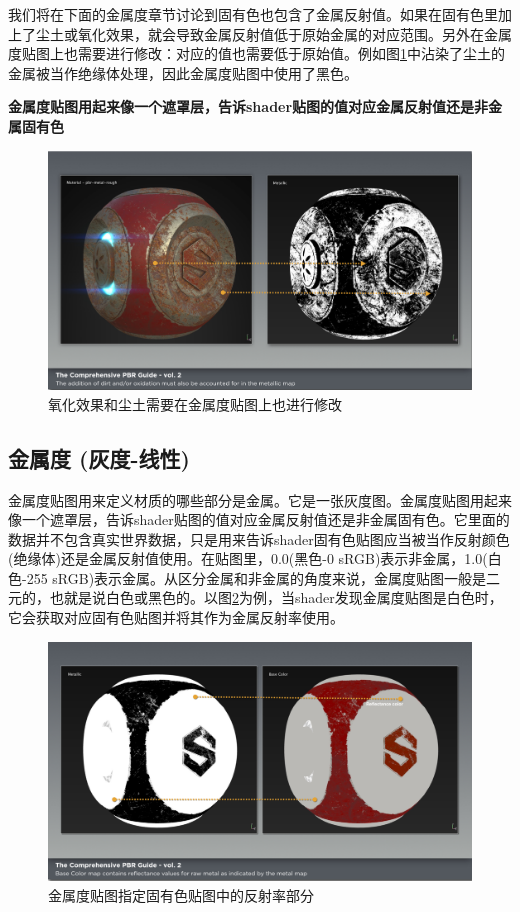我们将在下面的金属度章节讨论到固有色也包含了金属反射值。如果在固有色里加上了尘土或氧化效果，就会导致金属反射值低于原始金属的对应范围。另外在金属度贴图上也需要进行修改：对应的值也需要低于原始值。例如图\ref{fig:chap2_10}中沾染了尘土的金属被当作绝缘体处理，因此金属度贴图中使用了黑色。

\textbf{金属度贴图用起来像一个遮罩层，告诉shader贴图的值对应金属反射值还是非金属固有色}

\begin{figure}[ht]
    \centering
	\includegraphics[width=\textwidth]{images/chap2_10.png}
	\caption{氧化效果和尘土需要在金属度贴图上也进行修改}
    \label{fig:chap2_10}
\end{figure}

\subsection{金属度 (灰度-线性)}

金属度贴图用来定义材质的哪些部分是金属。它是一张灰度图。金属度贴图用起来像一个遮罩层，告诉shader贴图的值对应金属反射值还是非金属固有色。它里面的数据并不包含真实世界数据，只是用来告诉shader固有色贴图应当被当作反射颜色(绝缘体)还是金属反射值使用。在贴图里，0.0(黑色-0 sRGB)表示非金属，1.0(白色-255 sRGB)表示金属。从区分金属和非金属的角度来说，金属度贴图一般是二元的，也就是说白色或黑色的。以图\ref{fig:chap2_11}为例，当shader发现金属度贴图是白色时，它会获取对应固有色贴图并将其作为金属反射率使用。

\begin{figure}[ht]
    \centering
	\includegraphics[width=\textwidth]{images/chap2_11.png}
	\caption{金属度贴图指定固有色贴图中的反射率部分}
    \label{fig:chap2_11}
\end{figure}

